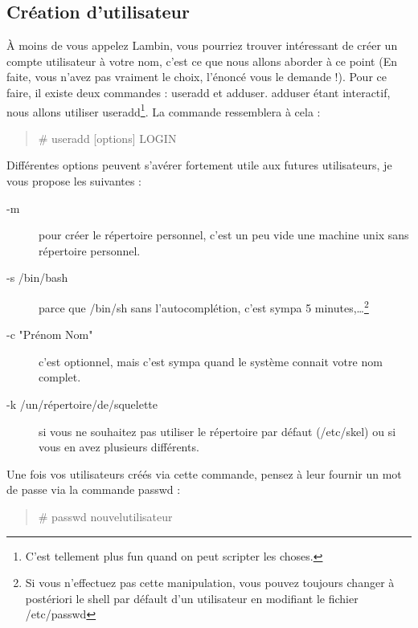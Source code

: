 \documentclass[a4paper]{article}
\newcommand{\commande}[1] {
    \begin{quote}
    \tt\raggedright #1 
    \end{quote}
}
\begin{document}
\subsection{Création d'utilisateur}
\par À moins de vous appelez Lambin, vous pourriez trouver intéressant de créer un compte utilisateur à votre nom, c'est ce que nous allons aborder à ce point (En faite, vous n'avez pas vraiment le choix, l'énoncé vous le demande !). Pour ce faire, il existe deux commandes : useradd et adduser. adduser étant interactif, nous allons utiliser useradd\footnote{C'est tellement plus fun quand on peut scripter les choses.}. La commande ressemblera à cela :
\commande{\# useradd [options] LOGIN}
\par Différentes options peuvent s'avérer fortement utile aux futures utilisateurs, je vous propose les suivantes :
\begin{description}
    \item[-m] pour créer le répertoire personnel, c'est un peu vide une machine unix sans répertoire personnel.
    \item[-s /bin/bash] parce que /bin/sh sans l'autocomplétion, c'est sympa 5 minutes,\ldots\footnote{Si vous n'effectuez pas cette manipulation, vous pouvez toujours changer à postériori le shell par défault d'un utilisateur en modifiant le fichier /etc/passwd}
    \item[-c "Prénom Nom"] c'est optionnel, mais c'est sympa quand le système connait votre nom complet.
    \item [-k /un/répertoire/de/squelette] si vous ne souhaitez pas utiliser le répertoire par défaut (/etc/skel) ou si vous en avez plusieurs différents.
\end{description}
\par Une fois vos utilisateurs créés via cette commande, pensez à leur fournir un mot de passe via la commande passwd :
\commande{\# passwd nouvelutilisateur}
\end{document}

